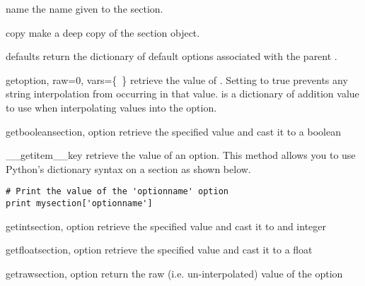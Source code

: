 \begin{memberdesc}[ConfigSection]{name}
the name given to the section.
\end{memberdesc}


\begin{methoddesc}[ConfigSection]{copy}{}
make a deep copy of the section object.
\end{methoddesc}

\begin{methoddesc}[ConfigSection]{defaults}{}
return the dictionary of default options associated with the parent
.
\end{methoddesc}

\begin{methoddesc}[ConfigManager]{get}{option, raw=0, vars=\{~\}}
retrieve the value of .
Setting  to true prevents any string interpolation from occurring
in that value.   is a dictionary of addition value to use 
when interpolating values into the option.

\end{methoddesc}

\begin{methoddesc}[ConfigManager]{getboolean}{section, option}
retrieve the specified value and cast it to a boolean
\end{methoddesc}

\begin{methoddesc}[ConfigSection]{__getitem__}{key}
retrieve the value of an option.  This method allows you to use Python's 
dictionary syntax on a section as shown below.
\begin{verbatim}
# Print the value of the 'optionname' option
print mysection['optionname'] 
\end{verbatim}
\end{methoddesc}

\begin{methoddesc}[ConfigManager]{getint}{section, option}
retrieve the specified value and cast it to and integer
\end{methoddesc}

\begin{methoddesc}[ConfigManager]{getfloat}{section, option}
retrieve the specified value and cast it to a float
\end{methoddesc}

\begin{methoddesc}[ConfigManager]{getraw}{section, option}
return the raw (i.e. un-interpolated) value of the option
\end{methoddesc}

